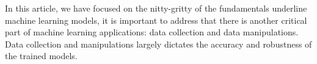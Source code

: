 In this article, we have focused on the nitty-gritty of the fundamentals underline machine learning models, it is important to address that there is another critical part of machine learning applications: data collection and data manipulations. Data collection and manipulations largely dictates the accuracy and robustness of the trained models. 